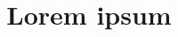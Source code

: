 \documentclass[a4paper,10pt]{article}
\begin{document}
	\title{Lorem ipsum}
	\maketitle
\begin{multicols}{2}
\lipsum[1-20]
\end{multicols}
\printbibliography
\end{document}
